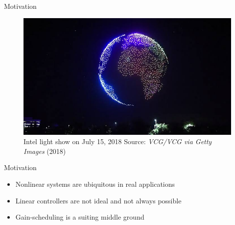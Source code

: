 \begin{frame}{Motivation}
\begin{figure}
\centering
\includegraphics[width=.8\textwidth]{figuras/images}
\caption{Intel light show on July 15, 2018 Source: \textit{VCG/VCG via Getty Images} (2018)}
\end{figure}
\end{frame}


\begin{frame}{Motivation}
\begin{itemize}
	\item Nonlinear systems are ubiquitous in real applications
	\item Linear controllers are not ideal and not always possible
	\item Gain-scheduling is a suiting middle ground
\end{itemize}
\end{frame}



